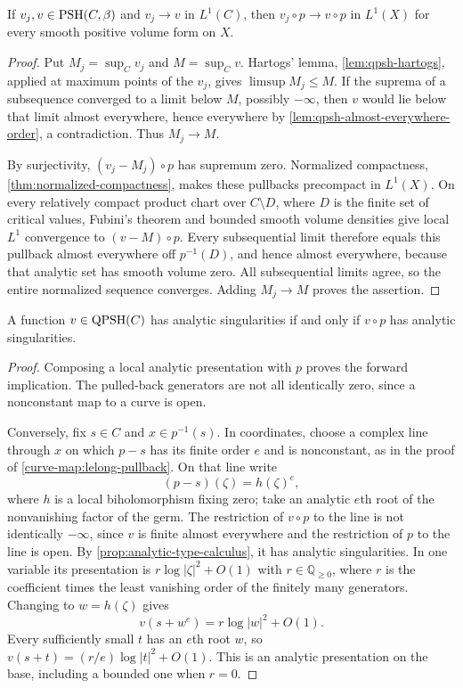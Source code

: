 \begin{lemma}\label{curve-map:lone-pullback}
If $v_j,v\in\mathrm{PSH}(C,\beta)$ and $v_j\to v$ in $L^1(C)$, then
$v_j\circ p\to v\circ p$ in $L^1(X)$ for every smooth positive
volume form on $X$.
\end{lemma}
\begin{proof}
Put $M_j=\sup_Cv_j$ and $M=\sup_Cv$. Hartogs' lemma,
\cref{lem:qpsh-hartogs}, applied at maximum points of the $v_j$,
gives $\limsup M_j\leq M$. If the suprema of a subsequence
converged to a limit below $M$, possibly $-\infty$, then $v$
would lie below that limit almost everywhere, hence everywhere
by \cref{lem:qpsh-almost-everywhere-order}, a contradiction.
Thus $M_j\to M$.

By surjectivity, $(v_j-M_j)\circ p$ has supremum zero. Normalized
compactness, \cref{thm:normalized-compactness}, makes these
pullbacks precompact in $L^1(X)$. On every relatively compact
product chart over $C\setminus D$, where $D$ is the finite set
of critical values, Fubini's theorem and bounded smooth volume
densities give local $L^1$ convergence to $(v-M)\circ p$.
Every subsequential limit therefore equals this pullback almost
everywhere off $p^{-1}(D)$, and hence almost everywhere, because that analytic
set has smooth volume zero. All subsequential limits agree,
so the entire normalized sequence converges. Adding $M_j\to M$
proves the assertion.
\end{proof}

\begin{lemma}\label{curve-map:analytic-types}
A function $v\in\mathrm{QPSH}(C)$ has analytic singularities if and
only if $v\circ p$ has analytic singularities.
\end{lemma}
\begin{proof}
Composing a local analytic presentation with $p$ proves the
forward implication. The pulled-back generators are not all
identically zero, since a nonconstant map to a curve is open.

Conversely, fix $s\in C$ and $x\in p^{-1}(s)$. In coordinates,
choose a complex line through $x$ on which $p-s$ has its finite
order $e$ and is nonconstant, as in the proof of
\cref{curve-map:lelong-pullback}. On that line write
\[
 (p-s)(\zeta)=h(\zeta)^e,
\]
where $h$ is a local biholomorphism fixing zero; take an analytic
$e$th root of the nonvanishing factor of the germ. The restriction
of $v\circ p$ to the line is not identically $-\infty$, since
$v$ is finite almost everywhere and the restriction of $p$ to
the line is open. By
\cref{prop:analytic-type-calculus}, it has analytic singularities.
In one variable its presentation is
$r\log|\zeta|^2+O(1)$ with $r\in\mathbb Q_{\geq0}$, where $r$ is
the coefficient times the least vanishing order of the finitely
many generators.
Changing to $w=h(\zeta)$ gives
\[
 v(s+w^e)=r\log|w|^2+O(1).
\]
Every sufficiently small $t$ has an $e$th root $w$, so
$v(s+t)=(r/e)\log|t|^2+O(1)$. This is an analytic presentation
on the base, including a bounded one when $r=0$.
\end{proof}

